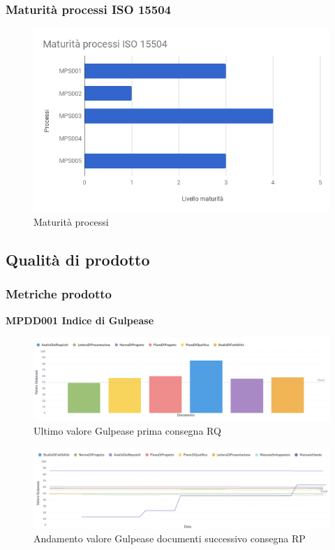 \documentclass[PianoDiQualifica.tex]{subfiles}
\begin{document}
\subsubsection{Maturità processi ISO 15504}
\begin{figure}[H]
	\centering
	\includegraphics[width=0.7\linewidth]{RQ/Processi}
	\caption{Maturità processi}
	\label{fig:processi}
\end{figure}


\newpage
\subsection{Qualità di prodotto}

\subsubsection{Metriche prodotto}

\textbf{MPDD001 Indice di Gulpease}
\begin{figure}[H]
	\centering
	\includegraphics[width=1\linewidth]{RQ/gulpease}
	\caption{Ultimo valore Gulpease prima consegna RQ}
	\label{fig:processi}
\end{figure}

\begin{figure}[H]
	\centering
	\includegraphics[width=1\linewidth]{RQ/gulpeasegrid}
	\caption{Andamento valore Gulpease documenti successivo consegna RP}
	\label{fig:processi}
\end{figure}
\end{document}
